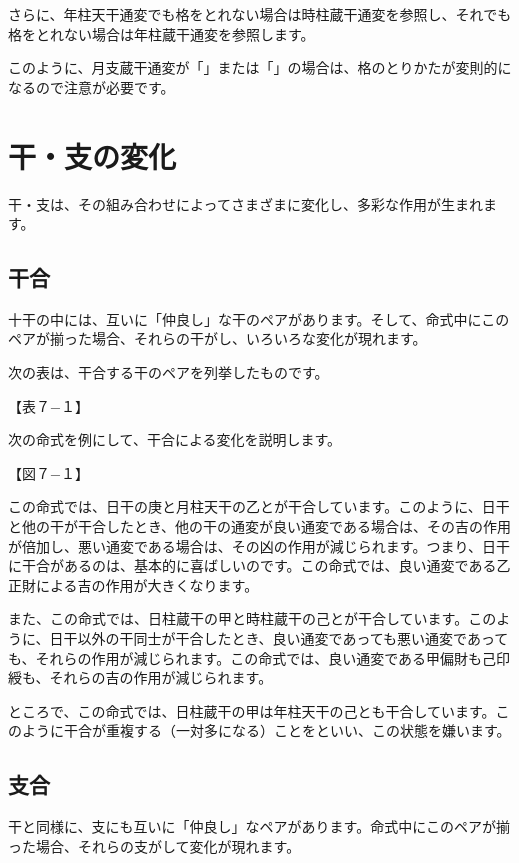 \documentclass[a5paper,11pt,dvipdfmx]{tarticle}
\begin{document}
さらに、年柱天干通変でも格をとれない場合は時柱蔵干通変を参照し、それでも格をとれない場合は年柱蔵干通変を参照します。

このように、月支蔵干通変が「」または「」の場合は、格のとりかたが変則的になるので注意が必要です。



\clearpage

\section{干・支の変化}

干・支は、その組み合わせによってさまざまに変化し、多彩な作用が生まれます。


\subsection{干合}
十干の中には、互いに「仲良し」な干のペアがあります。そして、命式中にこのペアが揃った場合、それらの干がし、いろいろな変化が現れます。

次の表は、干合する干のペアを列挙したものです。

【表７−１】

次の命式を例にして、干合による変化を説明します。

【図７−１】

この命式では、日干の庚と月柱天干の乙とが干合しています。このように、日干と他の干が干合したとき、他の干の通変が良い通変である場合は、その吉の作用が倍加し、悪い通変である場合は、その凶の作用が減じられます。つまり、日干に干合があるのは、基本的に喜ばしいのです。この命式では、良い通変である乙正財による吉の作用が大きくなります。

また、この命式では、日柱蔵干の甲と時柱蔵干の己とが干合しています。このように、日干以外の干同士が干合したとき、良い通変であっても悪い通変であっても、それらの作用が減じられます。この命式では、良い通変である甲偏財も己印綬も、それらの吉の作用が減じられます。

ところで、この命式では、日柱蔵干の甲は年柱天干の己とも干合しています。このように干合が重複する（一対多になる）ことをといい、この状態を嫌います。


\subsection{支合}
干と同様に、支にも互いに「仲良し」なペアがあります。命式中にこのペアが揃った場合、それらの支がして変化が現れます。
\end{document}
